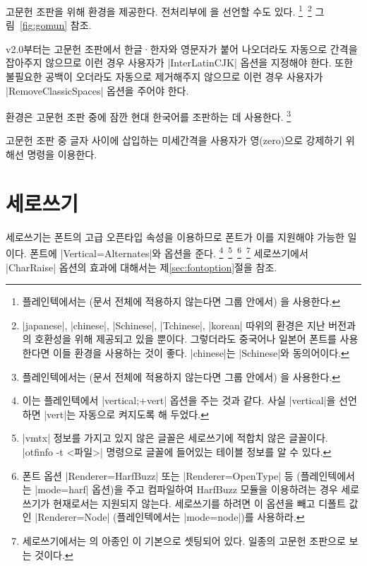 \documentclass[a4paper]{article}
\def\luatex{\hologo{LuaTeX}}
\def\logoko{\textsf{k}\kern-.0625em\textit{o}}
\def\luatexko{\luatex-\logoko}
\begin{document}
고문헌 조판을 위해  환경을 제공한다.
전처리부에 을 선언할 수도 있다.%
\footnote{%
  플레인텍에서는 (문서 전체에 적용하지 않는다면 그룹 안에서)
  을 사용한다. }\,%
\footnote{%
  |japanese|, |chinese|, |Schinese|, |Tchinese|, |korean| 따위의 환경은
  지난 버전과의 호환성을 위해 제공되고 있을 뿐이다.
  그렇더라도 중국어나 일본어 폰트를 사용한다면 이들 환경을 사용하는 것이 좋다.
  |chinese|는 |Schinese|와 동의어이다. }
그림~\ref{fig:gomun} 참조.

v2.0부터는 고문헌 조판에서 한글^^b7한자와 영문자가 붙어 나오더라도 자동으로
간격을 잡아주지 않으므로 이런 경우 사용자가 |InterLatinCJK| 옵션을
지정해야 한다.
또한 불필요한 공백이 오더라도 자동으로 제거해주지 않으므로 이런 경우
사용자가 |RemoveClassicSpaces| 옵션을 주어야 한다.

 환경은 고문헌 조판 중에 잠깐 현대 한국어를 조판하는 데
사용한다.%
\footnote{%
  플레인텍에서는 (문서 전체에 적용하지 않는다면 그룹 안에서)
  을 사용한다. }

고문헌 조판 중  글자 사이에 삽입하는 미세간격을 사용자가
영{\small(zero)}으로 강제하기 위해선 \pkgkwd{\inhibitglue} 명령을 이용한다.

\section{세로쓰기}\label{sec:verttype}

세로쓰기는 폰트의 고급 오픈타입 속성을 이용하므로 폰트가 이를 지원해야
가능한 일이다. 폰트에 |Vertical=Alternates|와 
옵션을 준다.%
\footnote{%
  이는 플레인텍에서 |vertical;+vert| 옵션을 주는 것과 같다.
  사실 |vertical|을 선언하면 |vert|는 자동으로 켜지도록 해 두었다. }\,%
\footnote{%
  |vmtx| 정보를 가지고 있지 않은 글꼴은 세로쓰기에 적합치 않은 글꼴이다.
  |otfinfo -t <파일>| 명령으로 글꼴에 들어있는 테이블 정보를 알 수 있다. }\,%
\footnote{%
  폰트 옵션 |Renderer=HarfBuzz| 또는 |Renderer=OpenType| 등
  (플레인텍에서는 |mode=harf| 옵션)을 주고
  컴파일하여 HarfBuzz 모듈을 이용하려는 경우 세로쓰기가
  현재로서는 지원되지 않는다. 세로쓰기를 하려면 이 옵션을 빼고 디폴트 값인
  |Renderer=Node| (플레인텍에서는 |mode=node|)를 사용하라.}\,%
\footnote{%
  세로쓰기에서는 의 아종인 이
  기본으로 셋팅되어 있다. 일종의 고문헌 조판으로 보는 것이다.
}
세로쓰기에서 |CharRaise| 옵션의 효과에 대해서는 제\ref{sec:fontoption}절을
참조.
\end{document}
